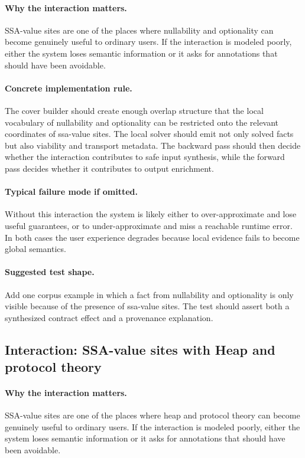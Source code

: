 \documentclass[11pt]{report}
\theoremstyle{definition}
\theoremstyle{plain}
\begin{document}
\paragraph{Why the interaction matters.}
SSA-value sites are one of the places where nullability and optionality can become
genuinely useful to ordinary users. If the interaction is modeled poorly,
either the system loses semantic information or it asks for annotations that
should have been avoidable.

\paragraph{Concrete implementation rule.}
The cover builder should create enough overlap structure that the local
vocabulary of nullability and optionality can be restricted onto the relevant
coordinates of ssa-value sites. The local solver should emit not only
solved facts but also viability and transport metadata. The backward pass
should then decide whether the interaction contributes to safe input
synthesis, while the forward pass decides whether it contributes to output
enrichment.

\paragraph{Typical failure mode if omitted.}
Without this interaction the system is likely either to over-approximate and
lose useful guarantees, or to under-approximate and miss a reachable runtime
error. In both cases the user experience degrades because local evidence
fails to become global semantics.

\paragraph{Suggested test shape.}
Add one corpus example in which a fact from nullability and optionality is only
visible because of the presence of ssa-value sites. The test should
assert both a synthesized contract effect and a provenance explanation.

\subsection{Interaction: SSA-value sites with Heap and protocol theory}

\paragraph{Why the interaction matters.}
SSA-value sites are one of the places where heap and protocol theory can become
genuinely useful to ordinary users. If the interaction is modeled poorly,
either the system loses semantic information or it asks for annotations that
should have been avoidable.
\end{document}
